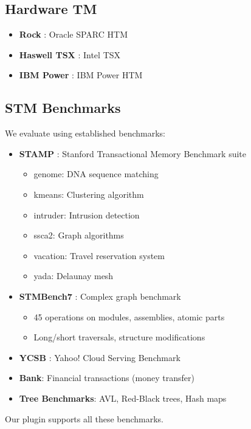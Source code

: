 \documentclass[article,12pt]{article}
\begin{document}
\begin{itemize}
\subsection{Hardware TM}

\begin{itemize}
\item \textbf{Rock} \cite{Rock}: Oracle SPARC HTM
\item \textbf{Haswell TSX} \cite{TSX}: Intel TSX
\item \textbf{IBM Power} \cite{Power}: IBM Power HTM
\end{itemize}

\subsection{STM Benchmarks}

We evaluate using established benchmarks:

\begin{itemize}
\item \textbf{STAMP} \cite{STAMP}: Stanford Transactional Memory Benchmark suite
  \begin{itemize}
  \item genome: DNA sequence matching
  \item kmeans: Clustering algorithm
  \item intruder: Intrusion detection
  \item ssca2: Graph algorithms
  \item vacation: Travel reservation system
  \item yada: Delaunay mesh
  \end{itemize}
\item \textbf{STMBench7} \cite{STMBench7}: Complex graph benchmark
  \begin{itemize}
  \item 45 operations on modules, assemblies, atomic parts
  \item Long/short traversals, structure modifications
  \end{itemize}
\item \textbf{YCSB} \cite{YCSB}: Yahoo! Cloud Serving Benchmark
\item \textbf{Bank}: Financial transactions (money transfer)
\item \textbf{Tree Benchmarks}: AVL, Red-Black trees, Hash maps
\end{itemize}

Our plugin supports all these benchmarks.


\end{itemize}
\end{document}
